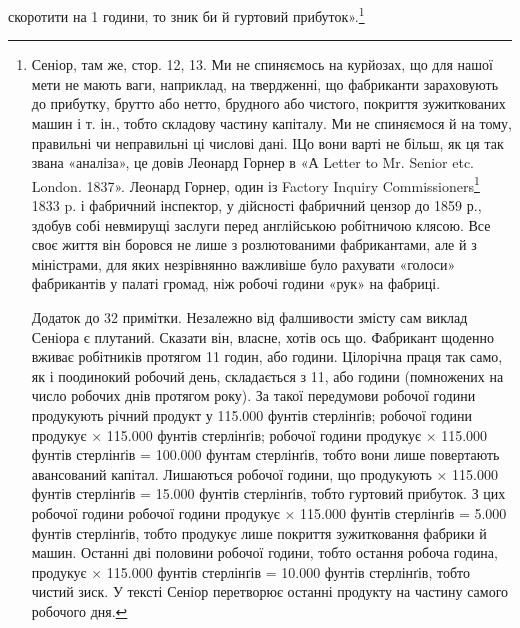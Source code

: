 скоротити на 1 години, то зник би й гуртовий прибуток».\footnote{
Сеніор, там же, стор. 12, 13. Ми не спиняємось на курйозах, що для нашої мети не мають ваги,
наприклад, на твердженні, що фабриканти зараховують до прибутку, брутто або нетто, брудного або
чистого, покриття зужиткованих машин і т. ін., тобто складову частину капіталу. Ми не
спиняємося й на тому, правильні чи неправильні ці числові дані. ІЦо вони
варті не більш, як ця так звана «аналіза», це довів Леонард Горнер в «А Letter to Mr. Senior etc.
London. 1837». Леонард Горнер, один із Factory Inquiry Commissioners\footnote*{
— членів комісії для розсліду відносин по фабриках. \emph{Ред.}
} 1833 p. і фабричний
інспектор, у дійсності
фабричний цензор до 1859 р., здобув собі невмирущі заслуги перед англійською робітничою клясою. Все
своє життя він боровся не лише з розлютованими фабрикантами, але й з міністрами, для яких
незрівнянно важливіше було рахувати «голоси» фабрикантів у палаті громад, ніж
робочі години «рук» на фабриці.

Додаток до 32 примітки. Незалежно від фалшивости змісту сам виклад Сеніора є плутаний. Сказати він,
власне, хотів ось що. Фабрикант щоденно вживає робітників протягом 11 годин, або  години.
Цілорічна праця так само, як і поодинокий робочий день, складається з 11,
або  години (помножених на число робочих днів протягом року). За такої передумови  робочої
години продукують річний продукт у 115.000 фунтів стерлінґів;  робочої години продукує  ×
115.000 фунтів стерлінґів;  робочої години продукує  × 115.000 фунтів стерлінґів = 100.000
фунтам стерлінґів, тобто вони лише повертають
авансований капітал. Лишаються  робочої години, що продукують  × 115.000 фунтів стерлінґів =
15.000 фунтів стерлінґів, тобто гуртовий прибуток. З цих  робочої години  робочої години
продукує  × 115.000 фунтів стерлінґів = 5.000 фунтів стерлінґів, тобто продукує
лише покриття зужитковання фабрики й машин. Останні дві половини робочої години, тобто остання
робоча година, продукує  × 115.000 фунтів стерлінґів = 10.000 фунтів стерлінґів, тобто чистий
зиск.
У тексті Сеніор перетворює останні  продукту на частину самого робочого
дня.
}


